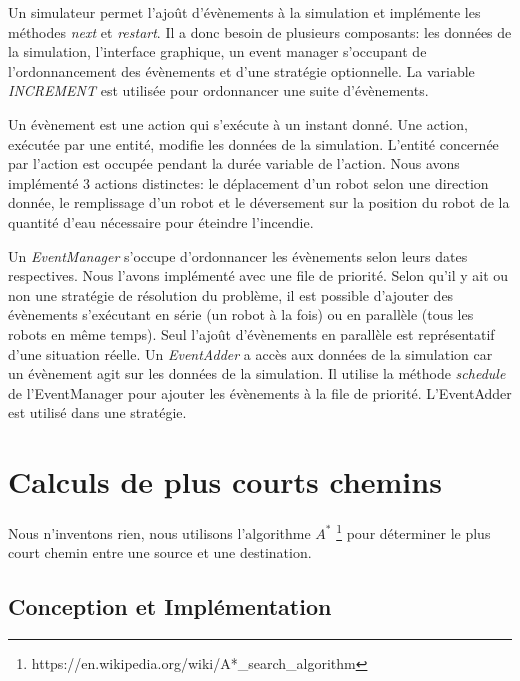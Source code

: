 \documentclass[a4paper, 10pt, french]{article}
\begin{document}
	Un simulateur permet l'ajoût d'évènements à la simulation et implémente les méthodes {\it next} et {\it restart}. Il a donc besoin de plusieurs composants: les données de la simulation, l'interface graphique, un event manager s'occupant de l'ordonnancement des évènements et d'une stratégie optionnelle. La variable {\it INCREMENT} est utilisée pour ordonnancer une suite d'évènements. 
	\par\leavevmode\par
	Un évènement est une action qui s'exécute à un instant donné. Une action, exécutée par une entité, modifie les données de la simulation. L'entité concernée par l'action est occupée pendant la durée variable de l'action.
	Nous avons implémenté 3 actions distinctes: le déplacement d'un robot selon une direction donnée, le remplissage d'un robot et le déversement sur la position du robot de la quantité d'eau nécessaire pour éteindre l'incendie.
	\par\leavevmode\par
	Un {\it EventManager} s'occupe d'ordonnancer les évènements selon leurs dates respectives. Nous l'avons implémenté avec une file de priorité. Selon qu'il y ait ou non une stratégie de résolution du problème, il est possible d'ajouter des évènements s'exécutant en série (un robot à la fois) ou en parallèle (tous les robots en même temps). Seul l'ajoût d'évènements en parallèle est représentatif d'une situation réelle. Un {\it EventAdder} a accès aux données de la simulation car un évènement agit sur les données de la simulation. Il utilise la méthode {\it schedule} de l'EventManager pour ajouter les évènements à la file de priorité. L'EventAdder est utilisé dans une stratégie.

\section{Calculs de plus courts chemins}

	Nous n'inventons rien, nous utilisons l'algorithme $A^*$ \footnote{https://en.wikipedia.org/wiki/A*\_search\_algorithm} pour déterminer le plus court chemin entre une source et une destination. 

	\subsection{Conception et Implémentation}
\end{document}
